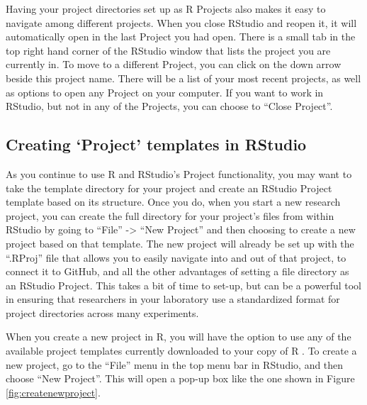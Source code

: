 \documentclass[]{tufte-book}
\begin{document}
Having your project directories set up as R Projects also makes it easy to
navigate among different projects. When you close RStudio and reopen it, it will
automatically open in the last Project you had open. There is a small tab in the
top right hand corner of the RStudio window that lists the project you are
currently in. To move to a different Project, you can click on the down arrow
beside this project name. There will be a list of your most recent projects, as
well as options to open any Project on your computer. If you want to work in
RStudio, but not in any of the Projects, you can choose to ``Close Project''.

\subsection{Creating `Project' templates in RStudio}\label{creating-project-templates-in-rstudio}

As you continue to use R and RStudio's Project functionality, you may want to
take the template directory for your project and create an RStudio Project
template based on its structure. Once you do, when you start a new research
project, you can create the full directory for your project's files from within
RStudio by going to ``File'' -\textgreater{} ``New Project'' and then choosing to create a new
project based on that template. The new project will already be set up with the
``.RProj'' file that allows you to easily navigate into and out of that project,
to connect it to GitHub, and all the other advantages of setting a file
directory as an RStudio Project. This takes a bit of time to set-up, but can
be a powerful tool in ensuring that researchers in your laboratory use a
standardized format for project directories across many experiments.

When you create a new project in R, you will have the option to use any of
the available project templates currently downloaded to your copy of R
\citep{rstudioprojecttemplate}. To create a new project, go to the ``File'' menu
in the top menu bar in RStudio, and then choose ``New Project''. This will open
a pop-up box like the one shown in Figure \ref{fig:createnewproject}.
\end{document}
